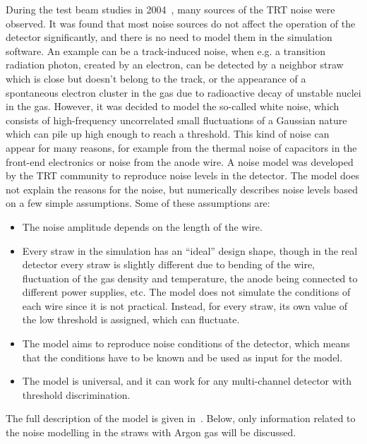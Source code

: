 During the test beam studies in 2004~\cite{trt_test_beam}, many sources of the TRT noise were observed.
It was found that most noise sources do not affect the operation of the detector significantly, and there is no need to model them in the simulation software.
An example can be a track-induced noise, when e.g. a transition radiation photon, created by an electron, can be detected by a neighbor straw which is close 
but doesn't belong to the track, or the appearance of a spontaneous electron cluster in the gas due to radioactive decay of unstable nuclei in the gas.
However, it was decided to model the so-called white noise, which consists of high-frequency uncorrelated small fluctuations of a Gaussian nature which can pile up high enough to reach a threshold. This kind of noise can appear for many reasons, for example from the thermal noise of capacitors in the front-end electronics
or noise from the anode wire. A noise model was developed by the TRT community to reproduce noise levels in the detector.
The model does not explain the reasons for the noise, but numerically describes noise levels based on a few simple assumptions.
Some of these assumptions are:
\begin{itemize}
 \item The noise amplitude depends on the length of the wire.
 \item Every straw in the simulation has an ``ideal'' design shape, though in the real detector every straw is slightly different due to bending of the wire, 
 fluctuation of the gas density and temperature, the anode being connected to different power supplies, etc. The model does not simulate the conditions of each wire since it is not practical. 
 Instead, for every straw, its own value of the low threshold is assigned, which can fluctuate.
 \item The model aims to reproduce noise conditions of the detector, which means that the conditions have to be known and be used as input for the model.
 \item The model is universal, and it can work for any multi-channel detector with threshold discrimination.
\end{itemize}
The full description of the model is given in~\cite{kittelmann_thesis}. 
Below, only information related to the noise modelling in the straws with Argon gas will be discussed.

